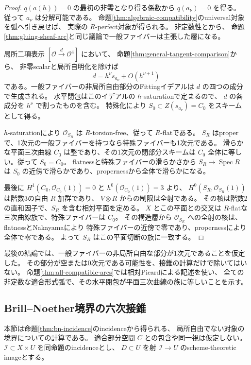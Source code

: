 \documentclass[a4paper,11pt]{ltjsarticle}
\theoremstyle{definition}
\newcommand{\OO}{\mathcal O}
\begin{document}
\begin{proof}
$q(a(h))=0$ の最初の非零となり得る係数から $q(a_\nu)=0$ を得る。
従って $a_\nu$ は分解可能である。
命題\ref{thm:algebraic-compatibility}のuniversal対象を弧へ引き戻せば、
実際の $R$-perfect対象が得られる。
非定数性と\cite[Proposition 5.5]{FLZ}から、
命題\ref{thm:gluing-sheaf-arc}と同じ議論で一般ファイバーは主張した層になる。

局所二項表示 $[\OO\xrightarrow d\OO^4]$ において、
命題\ref{thm:general-tangent-comparison}から、
非零scalarと局所自明化を除けば
\[
                         d=h^\nu s_{a_\nu}+O(h^{\nu+1})
\]
である。一般ファイバーの非局所自由部分のFittingイデアルは
$d$ の四つの成分で生成される。
水平閉包はこのイデアルの $h$-saturationで定まるので、
$d$ の各成分を $h^\nu$ で割ったものを含む。
特殊化により $S_0\subset Z(s_{a_\nu})=C_0$ をスキームとして得る。

$h$-saturationにより $\OO_{S_R}$ は $R$-torsion-free、従って $R$-flatである。
$S_R$ はproperで、1次元の一般ファイバーを持つなら特殊ファイバーも1次元である。
滑らかな平面三次曲線 $C_0$ は整であり、その1次元の閉部分スキームは
$C_0$ 全体に等しい。従って $S_0=C_0$。
flatnessと特殊ファイバーの滑らかさから $S_R\to\operatorname{Spec}R$ は
$S_0$ の近傍で滑らかであり、propernessから全体で滑らかになる。

最後に $H^1(C_0,\OO_{C_0}(1))=0$ と $h^0(\OO_{C_0}(1))=3$ より、
$H^0(S_R,\OO_{S_R}(1))$ は階数3の自由 $R$-加群であり、
$V\otimes R$ からの制限は全射である。
その核は階数2の直和因子で、$S_R$ を含む相対平面を定める。
$X$ とこの平面との交叉は $R$-flatな三次曲線族で、特殊ファイバーは $C_0$。
その構造層から $\OO_{S_R}$ への全射の核は、flatnessとNakayamaにより
特殊ファイバーの近傍で零であり、propernessにより全体で零である。
よって $S_R$ はこの平面切断の族に一致する。
\end{proof}

最後の結論では、一般ファイバーの非局所自由な部分が1次元であることを仮定した。
その部分が空または0次元である可能性を、接錐の計算だけで除いてはいない。
命題\ref{thm:all-compatible-arcs}では相対Picardによる記述を使い、
全ての非定数な適合形式弧で、その水平閉包が平面三次曲線の族に等しいことを示す。

\subsection{Brill--Noether境界の六次接錐}\label{sec:sextic-boundary}

本節は命題\ref{thm:bn-incidence}のincidenceから得られる、
局所自由でない対象の境界についての計算である。
適合部分空間 $C$ との包含や同一視は仮定しない。
$\mathcal I\subset X\times U$ を同命題のincidenceとし、
$D\subset U$ を射 $\mathcal I\to U$ のscheme-theoretic imageとする。
\end{document}
